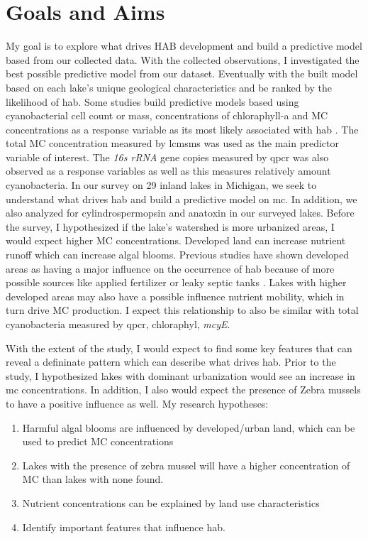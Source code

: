  \section{Goals and Aims}
My goal is to explore what drives HAB development and build a predictive model based from our collected data.  With the collected observations, I investigated the best possible predictive model from our dataset. Eventually with the built model based on each lake's unique geological characteristics and be ranked by the likelihood of \gls{hab}.
Some studies build predictive models based using cyanobacterial cell count or mass, concentrations of chloraphyll-a and MC concentrations as a response variable as its most likely associated with \gls{hab} \cite{moore_richard_cyanobacterial_1993, ahn_evaluation_2011, jiang_statistical_2008, beaulieu_nutrients_2013, taranu_predicting_2017}.
The total MC concentration measured by \gls{lcmsms} was used as the main predictor variable of interest. The \emph{16s rRNA} gene copies measured by \gls{qpcr} was also observed as a response variables as well as this measures relatively amount cyanobacteria. In our survey on 29 inland lakes in Michigan, we seek to understand what drives \gls{hab} and build a predictive model on \gls{mc}. In addition, we also analyzed for cylindrospermopsin and anatoxin in our surveyed lakes. Before the survey, I hypothesized if the lake's watershed is more urbanized areas, I would expect higher MC concentrations. Developed land can increase nutrient runoff which can increase algal blooms. Previous studies have shown developed areas as having a major influence on the occurrence of \gls{hab} because of more possible sources like applied fertilizer or leaky septic tanks \cite{beaver_land_2014, anderson_harmful_2002}. Lakes with higher developed areas may also have a possible influence nutrient mobility, which in turn drive MC production. I expect this relationship to also be similar with total cyanobacteria measured by \gls{qpcr}, chloraphyl, \emph{mcyE}. %

With the extent of the study, I would expect to find some key features that can reveal a defininate pattern which can describe what drives \gls{hab}. Prior to the study, I hypothesized lakes with dominant urbanization would see an increase in \gls{mc} concentrations. In addition, I also would expect the presence of Zebra mussels to have a positive influence as well. My research hypotheses:

\begin{enumerate}
 \item Harmful algal blooms are influenced by  developed/urban land, which can be used to predict MC concentrations
 \item Lakes with the presence of zebra mussel will have a higher concentration of MC than lakes with none found.
 \item Nutrient concentrations can be explained by land use characteristics
 \item Identify important features that influence \gls{hab}.

\end{enumerate}
